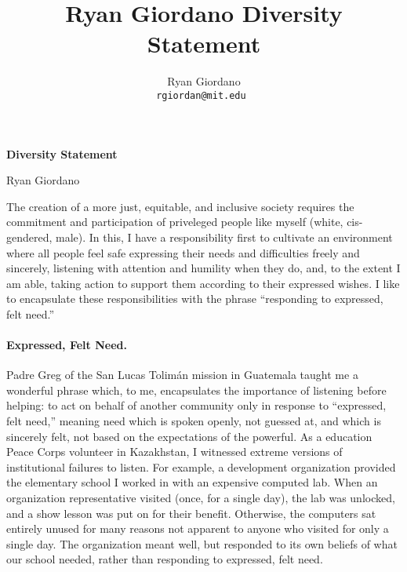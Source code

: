 
\usepackage{enumitem}

\usepackage{geometry}
\geometry{top=0.5in}
\geometry{left=1.0in}
\geometry{right=1.0in}


\title{Ryan Giordano Diversity Statement}

\author{
  Ryan Giordano \\ \texttt{rgiordan@mit.edu }
}



\begin{minipage}[t]{0.5\textwidth}
\hspace{-2em} %
{\bf \LARGE Diversity Statement}\\
\end{minipage}
\begin{minipage}[t]{0.5\textwidth}
        \hspace{8em} %
        {\LARGE Ryan Giordano}
\end{minipage}

The creation of a more just, equitable, and inclusive society requires the
commitment and participation of priveleged people like myself (white,
cis-gendered, male). In this, I have a responsibility first to cultivate an
environment where all people feel safe expressing their needs and difficulties
freely and sincerely, listening with attention and humility when they do, and,
to the extent I am able, taking action to support them according to their
expressed wishes.  I like to encapsulate these responsibilities with the
phrase ``responding to expressed, felt need.''


\paragraph{Expressed, Felt Need.}
%
Padre Greg of the San Lucas Tolimán mission in Guatemala taught me a wonderful
phrase which, to me, encapsulates the importance of listening before helping: to
act on behalf of another community only in response to ``expressed, felt need,''
meaning need which is spoken openly, not guessed at, and which is sincerely
felt, not based on the expectations of the powerful.  As a education Peace Corps
volunteer in Kazakhstan, I witnessed extreme versions of institutional failures
to listen. For example, a development organization provided the elementary
school I worked in with an expensive computed lab.  When an organization
representative visited (once, for a single day), the lab was unlocked, and a
show lesson was put on for their benefit.  Otherwise, the computers sat entirely
unused for many reasons not apparent to anyone who visited for only a single
day. The organization meant well, but responded to its own beliefs of what our
school needed, rather than responding to expressed, felt need.

